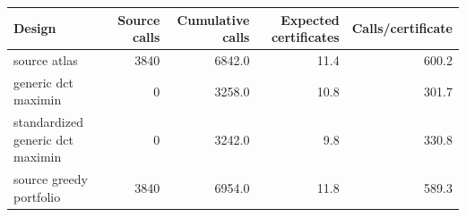\begin{tabular}{lrrrr}
\toprule
Design & Source calls & Cumulative calls & Expected certificates & Calls/certificate \\
\midrule
source atlas & 3840 & 6842.0 & 11.4 & 600.2 \\
generic dct maximin & 0 & 3258.0 & 10.8 & 301.7 \\
standardized generic dct maximin & 0 & 3242.0 & 9.8 & 330.8 \\
source greedy portfolio & 3840 & 6954.0 & 11.8 & 589.3 \\
\bottomrule
\end{tabular}
